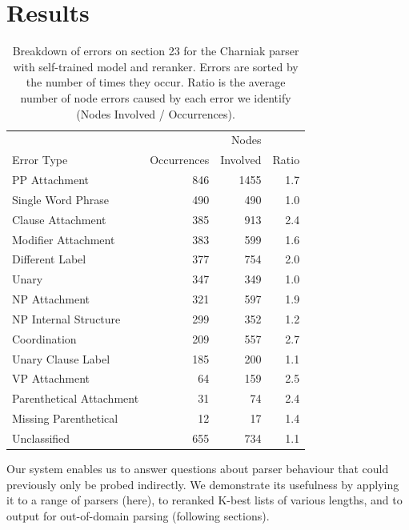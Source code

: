 \section{Results}

\begin{table}
\begin{center}
\begin{tabular}{|lrrr|}
	\hline
		           &             & Nodes    &       \\
		Error Type & Occurrences & Involved & Ratio \\
	\hline
	\hline
		PP Attachment & 846 & 1455 & 1.7 \\
		Single Word Phrase & 490 & 490 & 1.0 \\
		Clause Attachment & 385 & 913 & 2.4 \\
		Modifier Attachment & 383 & 599 & 1.6 \\
		Different Label & 377 & 754 & 2.0 \\
		Unary & 347 & 349 & 1.0 \\
		NP Attachment & 321 & 597 & 1.9 \\
		NP Internal Structure & 299 & 352 & 1.2 \\
		Coordination & 209 & 557 & 2.7 \\
		Unary Clause Label & 185 & 200 & 1.1 \\
		VP Attachment & 64 & 159 & 2.5 \\
		Parenthetical Attachment & 31 & 74 & 2.4 \\
		Missing Parenthetical & 12 & 17 & 1.4 \\
		Unclassified & 655 & 734 & 1.1 \\
	\hline
\end{tabular}
\caption[Breakdown of errors on section 23 for the Charniak parser with self-trained model and reranker.]{ \label{tab:charniak-breakdown}
	Breakdown of errors on section 23 for the Charniak parser with self-trained model and reranker.
	Errors are sorted by the number of times they occur.
	Ratio is the average number of node errors caused by each error we identify
	(\myie Nodes Involved / Occurrences).
}
\end{center}
\end{table}

Our system enables us to answer questions about parser behaviour that could previously only be probed indirectly.
We demonstrate its usefulness by applying it to a range of parsers (here), to reranked K-best lists of various lengths, and to output for out-of-domain parsing (following sections).

